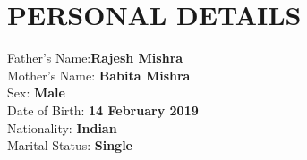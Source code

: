 \documentclass[paper=a4,fontsize=12pt]{scrartcl}
\newcommand{\NewPart}[1]{\section*{\uppercase{#1}}}
\begin{document}
\NewPart{Personal Details}{}
\begin{minipage}{0.6\textwidth}\raggedright 
\indent Father's Name:\textbf{Rajesh Mishra} \\
\indent Mother's Name: \textbf{Babita Mishra} \\
\indent Sex: \textbf{Male}\\
\indent Date of Birth: \textbf{14 February 2019}\\
\indent Nationality: \textbf{Indian}\\
\indent Marital Status: \textbf{Single}\\
\end{minipage}
\end{document}
